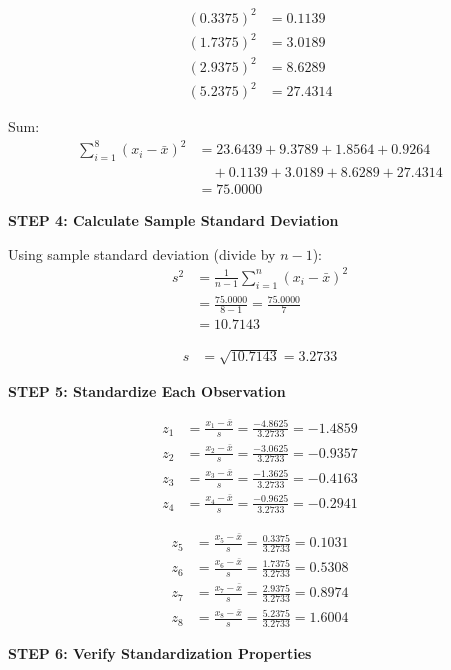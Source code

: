 \documentclass[12pt]{article}
\begin{document}
\begin{solution}
\begin{align*}
(0.3375)^2 &= 0.1139 \\
(1.7375)^2 &= 3.0189 \\
(2.9375)^2 &= 8.6289 \\
(5.2375)^2 &= 27.4314
\end{align*}

Sum:
\begin{align*}
\sum_{i=1}^{8} (x_i - \bar{x})^2 &= 23.6439 + 9.3789 + 1.8564 + 0.9264 \\
&\quad + 0.1139 + 3.0189 + 8.6289 + 27.4314 \\
&= 75.0000
\end{align*}

\textbf{STEP 4: Calculate Sample Standard Deviation}

Using sample standard deviation (divide by $n-1$):
\begin{align*}
s^2 &= \frac{1}{n-1}\sum_{i=1}^{n} (x_i - \bar{x})^2 \\
&= \frac{75.0000}{8-1} = \frac{75.0000}{7} \\
&= 10.7143
\end{align*}

\begin{align*}
s &= \sqrt{10.7143} = 3.2733
\end{align*}

\textbf{STEP 5: Standardize Each Observation}

\begin{align*}
z_1 &= \frac{x_1 - \bar{x}}{s} = \frac{-4.8625}{3.2733} = -1.4859 \\
z_2 &= \frac{x_2 - \bar{x}}{s} = \frac{-3.0625}{3.2733} = -0.9357 \\
z_3 &= \frac{x_3 - \bar{x}}{s} = \frac{-1.3625}{3.2733} = -0.4163 \\
z_4 &= \frac{x_4 - \bar{x}}{s} = \frac{-0.9625}{3.2733} = -0.2941
\end{align*}

\begin{align*}
z_5 &= \frac{x_5 - \bar{x}}{s} = \frac{0.3375}{3.2733} = 0.1031 \\
z_6 &= \frac{x_6 - \bar{x}}{s} = \frac{1.7375}{3.2733} = 0.5308 \\
z_7 &= \frac{x_7 - \bar{x}}{s} = \frac{2.9375}{3.2733} = 0.8974 \\
z_8 &= \frac{x_8 - \bar{x}}{s} = \frac{5.2375}{3.2733} = 1.6004
\end{align*}

\textbf{STEP 6: Verify Standardization Properties}


\end{solution}
\end{document}
